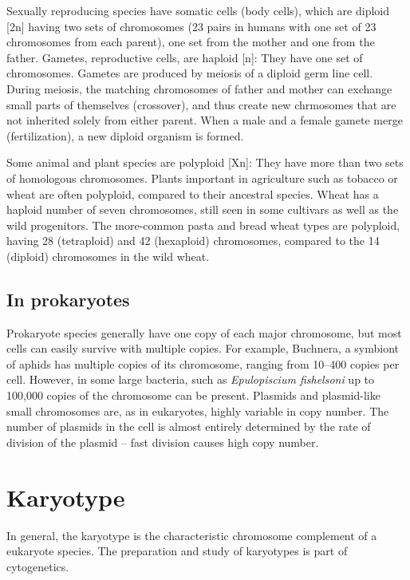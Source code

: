 Sexually reproducing species have somatic cells (body cells), which are diploid {[}2n{]} having two sets of chromosomes (23 pairs in humans with one set of 23 chromosomes from each parent), one set from the mother and one from the father. Gametes, reproductive cells, are haploid {[}n{]}: They have one set of chromosomes. Gametes are produced by meiosis of a diploid germ line cell. During meiosis, the matching chromosomes of father and mother can exchange small parts of themselves (crossover), and thus create new chrmosomes that are not inherited solely from either parent. When a male and a female gamete merge (fertilization), a new diploid organism is formed.

Some animal and plant species are polyploid {[}Xn{]}: They have more than two sets of homologous chromosomes. Plants important in agriculture such as tobacco or wheat are often polyploid, compared to their ancestral species. Wheat has a haploid number of seven chromosomes, still seen in some cultivars as well as the wild progenitors. The more-common pasta and bread wheat types are polyploid, having 28 (tetraploid) and 42 (hexaploid) chromosomes, compared to the 14 (diploid) chromosomes in the wild wheat.

\hypertarget{in-prokaryotes}{%
\subsection{In prokaryotes}\label{in-prokaryotes}}

Prokaryote species generally have one copy of each major chromosome, but most cells can easily survive with multiple copies. For example, Buchnera, a symbiont of aphids has multiple copies of its chromosome, ranging from 10--400 copies per cell. However, in some large bacteria, such as \emph{Epulopiscium fishelsoni} up to 100,000 copies of the chromosome can be present. Plasmids and plasmid-like small chromosomes are, as in eukaryotes, highly variable in copy number. The number of plasmids in the cell is almost entirely determined by the rate of division of the plasmid -- fast division causes high copy number.

\hypertarget{karyotype-1}{%
\section{Karyotype}\label{karyotype-1}}

In general, the karyotype is the characteristic chromosome complement of a eukaryote species. The preparation and study of karyotypes is part of cytogenetics.

